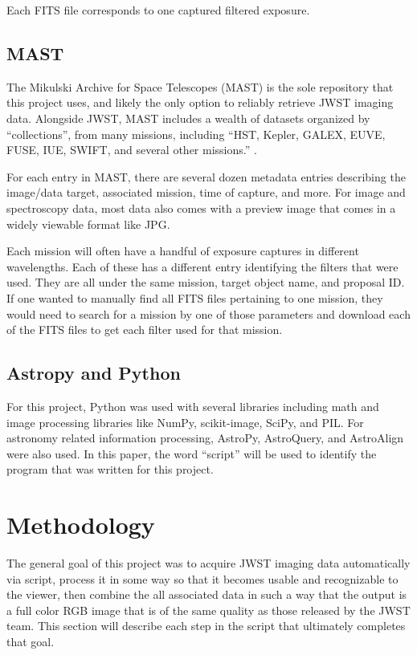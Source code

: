 \documentclass[10pt,twocolumn,letterpaper]{article}
\begin{document}
Each FITS file corresponds to one captured filtered exposure.

\subsection{MAST}

The Mikulski Archive for Space Telescopes (MAST) is the sole repository that this project uses, and likely the only option to reliably retrieve JWST imaging data. Alongside JWST, MAST includes a wealth of datasets organized by ``collections'', from many missions, including ``HST, Kepler, GALEX, EUVE, FUSE, IUE, SWIFT, and several other missions.'' \cite{mast}.

For each entry in MAST, there are several dozen metadata entries describing the image/data target, associated mission, time of capture, and more. For image and spectroscopy data, most data also comes with a preview image that comes in a widely viewable format like JPG.

Each mission will often have a handful of exposure captures in different wavelengths. Each of these has a different entry identifying the filters that were used. They are all under the same mission, target object name, and proposal ID. If one wanted to manually find all FITS files pertaining to one mission, they would need to search for a mission by one of those parameters and download each of the FITS files to get each filter used for that mission.

\subsection{Astropy and Python}
For this project, Python was used with several libraries including math and image processing libraries like NumPy, scikit-image, SciPy, and PIL. For astronomy related information processing, AstroPy, AstroQuery, and AstroAlign were also used. In this paper, the word ``script'' will be used to identify the program that was written for this project.

\section{Methodology}
\label{sec:script}
The general goal of this project was to acquire JWST imaging data automatically via script, process it in some way so that it becomes usable and recognizable to the viewer, then combine the all associated data in such a way that the output is a full color RGB image that is of the same quality as those released by the JWST team. This section will describe each step in the script that ultimately completes that goal.
\end{document}
